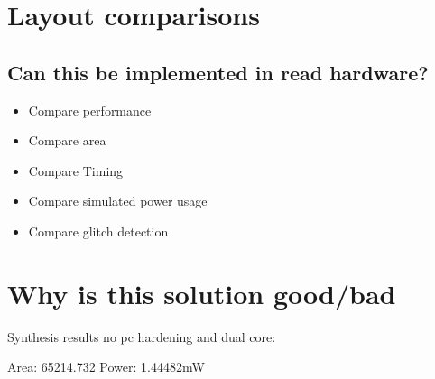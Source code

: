 \section{Layout comparisons}

\subsection{Can this be implemented in read hardware?}
\begin{itemize}
    \item Compare performance 
    \item Compare area
    \item Compare Timing 
    \item Compare simulated power usage
    \item Compare glitch detection
\end{itemize}

\section{Why is this solution good/bad}

Synthesis results no pc hardening and dual core:

Area: 65214.732
Power: 1.44482mW
